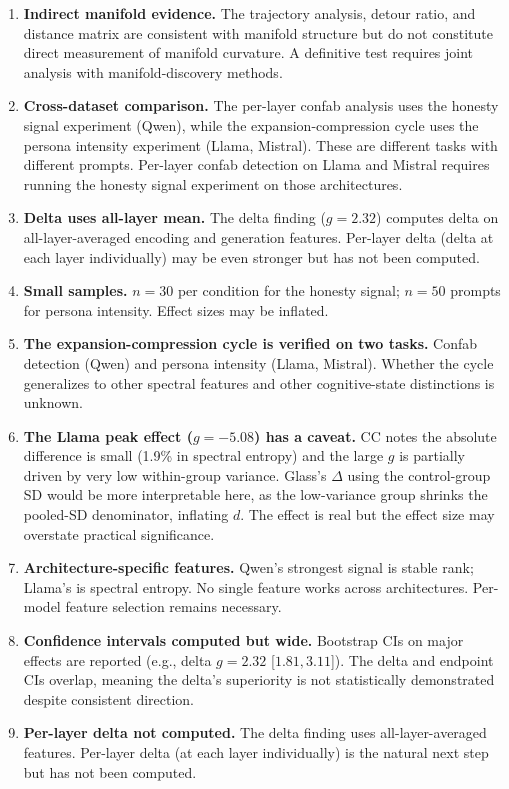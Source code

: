 \documentclass[11pt,a4paper]{article}
\begin{document}
\begin{enumerate}
\item \textbf{Indirect manifold evidence.} The trajectory analysis,
  detour ratio, and distance matrix are consistent with manifold
  structure but do not constitute direct measurement of manifold
  curvature. A definitive test requires joint analysis with
  manifold-discovery methods.

\item \textbf{Cross-dataset comparison.} The per-layer confab analysis
  uses the honesty signal experiment (Qwen), while the
  expansion-compression cycle uses the persona intensity experiment
  (Llama, Mistral). These are different tasks with different prompts.
  Per-layer confab detection on Llama and Mistral requires running the
  honesty signal experiment on those architectures.

\item \textbf{Delta uses all-layer mean.} The delta finding
  ($g = 2.32$) computes delta on all-layer-averaged encoding and
  generation features. Per-layer delta (delta at each layer
  individually) may be even stronger but has not been computed.

\item \textbf{Small samples.} $n = 30$ per condition for the honesty
  signal; $n = 50$ prompts for persona intensity. Effect sizes may be
  inflated.

\item \textbf{The expansion-compression cycle is verified on two
    tasks.} Confab detection (Qwen) and persona intensity
  (Llama, Mistral). Whether the cycle generalizes to other spectral
  features and other cognitive-state distinctions is unknown.

\item \textbf{The Llama peak effect ($g = -5.08$) has a caveat.}
  CC notes the absolute difference is small (1.9\% in spectral
  entropy) and the large $g$ is partially driven by very low
  within-group variance. Glass's $\Delta$ using the control-group SD
  would be more interpretable here, as the low-variance group shrinks the pooled-SD denominator,
  inflating $d$. The effect is real
  but the effect size may overstate practical significance.

\item \textbf{Architecture-specific features.} Qwen's strongest
  signal is stable rank; Llama's is spectral entropy. No single
  feature works across architectures. Per-model feature selection
  remains necessary.

\item \textbf{Confidence intervals computed but wide.} Bootstrap CIs
  on major effects are reported (e.g., delta $g = 2.32$ [$1.81, 3.11$]).
  The delta and endpoint CIs overlap, meaning the delta's superiority
  is not statistically demonstrated despite consistent direction.

\item \textbf{Per-layer delta not computed.} The delta finding uses
  all-layer-averaged features. Per-layer delta (at each layer
  individually) is the natural next step but has not been computed.
\end{enumerate}
\end{document}
